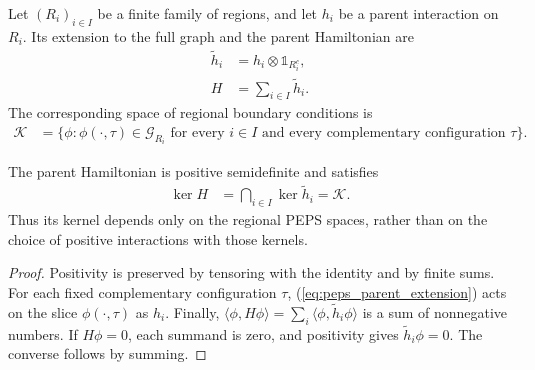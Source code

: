 \begin{definition}%
    \label{def:peps_region_parent_hamiltonian}
    \leanok
    Let $(R_i)_{i\in I}$ be a finite family of regions, and let $h_i$
    be a parent interaction on $R_i$. Its extension to the full graph
    and the parent Hamiltonian are
    \begin{align}
        \widetilde h_i & =h_i\otimes\mathbb 1_{R_i^c},
        \label{eq:peps_parent_extension}               \\
        H              & =\sum_{i\in I}\widetilde h_i.
        \label{eq:peps_parent_sum}
    \end{align}
    The corresponding space of regional boundary conditions is
    \begin{align}
        \mathcal K
         & =\{\phi: \phi(\cdot,\tau)\in\mathcal G_{R_i}
        \text{ for every }i\in I
        \text{ and every complementary configuration }\tau\}.
        \label{eq:peps_parent_common_kernel}
    \end{align}
\end{definition}

\begin{lemma}%
    \label{thm:peps_region_parent_common_kernel}
    \leanok
    The parent Hamiltonian is positive semidefinite and satisfies
    \begin{align}
        \ker H & =\bigcap_{i\in I}\ker\widetilde h_i=\mathcal K.
        \label{eq:peps_parent_kernel}
    \end{align}
    Thus its kernel depends only on the regional PEPS spaces, rather
    than on the choice of positive interactions with those kernels.
\end{lemma}

\begin{proof}\leanok
    Positivity is preserved by tensoring with the identity and by
    finite sums. For each fixed complementary configuration $\tau$,
    (\ref{eq:peps_parent_extension}) acts on the slice
    $\phi(\cdot,\tau)$ as $h_i$. Finally,
    $\langle\phi,H\phi\rangle=\sum_i
        \langle\phi,\widetilde h_i\phi\rangle$ is a sum of nonnegative
    numbers. If $H\phi=0$, each summand is zero, and positivity gives
    $\widetilde h_i\phi=0$. The converse follows by summing.
\end{proof}

